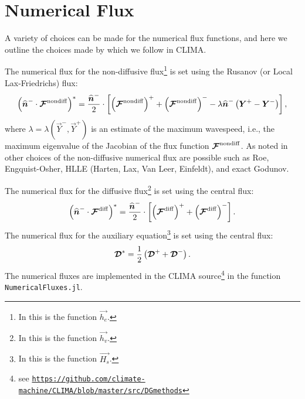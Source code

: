 \documentclass{report}
\begin{document}
\section{Numerical Flux}
A variety of choices can be made for the numerical flux functions, and here we
outline the choices made by \citet{bassi:1997nse} which we follow in CLIMA.

The numerical flux for the non-diffusive flux\footnote{In \citet[Eq.
(10)]{bassi:1997nse} this is the function $\vec{h_{e}}$.} is set using the
Rusanov (or Local Lax-Friedrichs) flux:
\begin{equation}
  \left( \widehat{\boldsymbol{{n}}}^{-} \cdot \boldsymbol{{\mathcal{F}}}^{\mathrm{nondiff}}\right)^{*} =
  \frac{\widehat{\boldsymbol{{n}}}^{-}}{2} \cdot 
  \left[ \left(\boldsymbol{{\mathcal{F}}}^{\mathrm{nondiff}}\right) ^{+} +
  \left(\boldsymbol{{\mathcal{F}}}^{\mathrm{nondiff}}\right)^{-}
  -
  \lambda \widehat{\boldsymbol{{n}}}^{-} \left( \boldsymbol{{Y}}^{+} - \boldsymbol{{Y}}^{-} \right) 
  \right],
  \label{eq:nondiff_flux}
\end{equation}
where $\lambda = \lambda(\vec{Y}^{-}, \vec{Y}^{+})$ is an estimate of the
maximum wavespeed, i.e., the maximum eigenvalue of the Jacobian of the flux
function $\boldsymbol{{\mathcal{F}}}^{\mathrm{nondiff}}$. 
As noted in \citet{bassi:1997nse} other choices of the
non-diffusive numerical flux are possible such as Roe, Engquist-Osher, HLLE
(Harten, Lax, Van Leer, Einfeldt), and exact Godunov.

The numerical flux for the diffusive flux\footnote{In \citet[Eq.
(15)]{bassi:1997nse} this is the function $\vec{h_{v}}$.} is set using the
central flux:
\begin{equation}
  \left( \widehat{\boldsymbol{{n}}}^{-} \cdot \boldsymbol{{\mathcal{F}}}^{\mathrm{diff}}\right)^{*} =
  \frac{\widehat{\boldsymbol{{n}}}^{-}}{2} \cdot \left[
  \left(\boldsymbol{{\mathcal{F}}}^{\mathrm{diff}}\right)^{+} + \left(\boldsymbol{{\mathcal{F}}}^{\mathrm{diff}}\right)^{-} \right].
   \label{eq:diff_flux}
\end{equation}
The numerical flux for the auxiliary equation\footnote{In \citet[Eq.
(13)]{bassi:1997nse} this is the function $\vec{H_{s}}$.} is set using the
central flux:
\begin{equation}
  \boldsymbol{{\mathcal{D}}}^{*} = \frac{1}{2} \left( \boldsymbol{{\mathcal{D}}}^{+} + \boldsymbol{{\mathcal{D}}}^{-} \right).
  \label{eq:D_flux}
\end{equation}
The numerical fluxes are implemented in the CLIMA
source\footnote{see
\texttt{\url{https://github.com/climate-machine/CLIMA/blob/master/src/DGmethods}}}
in the function \texttt{NumericalFluxes.jl}.
\end{document}
